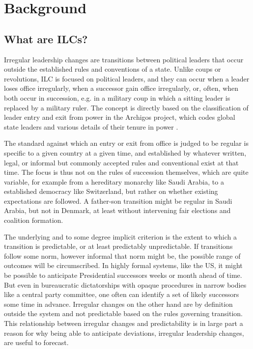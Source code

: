 \documentclass[pdftex,11pt]{article}
\begin{document}
\section{Background}

\subsection{What are ILCs?}

Irregular leadership changes are transitions between political leaders that occur outside the established rules and conventions of a state. Unlike coups or revolutions, ILC is focused on political leaders, and they can occur when a leader loses office irregularly, when a successor gain office irregularly, or, often, when both occur in succession, e.g. in a military coup in which a sitting leader is replaced by a military ruler. The concept is directly based on the classification of leader entry and exit from power in the Archigos project, which codes global state leaders and various details of their tenure in power \citep{goemans:etal:2009}.

The standard against which an entry or exit from office is judged to be regular is specific to a given country at a given time, and established by whatever written, legal, or informal but commonly accepted rules and conventional exist at that time. The focus is thus not on the rules of succession themselves, which are quite variable, for example from a hereditary monarchy like Saudi Arabia, to a established democracy like Switzerland, but rather on whether existing expectations are followed. A father-son transition might be regular in Saudi Arabia, but not in Denmark, at least without intervening fair elections and coalition formation. 

The underlying and to some degree implicit criterion is the extent to which a transition is predictable, or at least predictably unpredictable. If transitions follow some norm, however informal that norm might be, the possible range of outcomes will be circumscribed. In highly formal systems, like the US, it might be possible to anticipate Presidential successors weeks or month ahead of time. But even in bureaucratic dictatorships with opaque procedures in narrow bodies like a central party committee, one often can identify a set of likely successors some time in advance. Irregular changes on the other hand are by definition outside the system and not predictable based on the rules governing transition. This relationship between irregular changes and predictability is in large part a reason for why being able to anticipate deviations, irregular leadership changes, are useful to forecast.  
\end{document}
